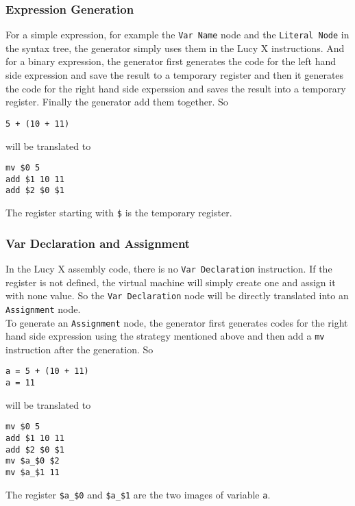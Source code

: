 \subsubsection{Expression Generation}
For a simple expression, for example the \texttt{Var Name} node and the \texttt{Literal Node} in the syntax tree, the generator simply uses them in the Lucy X instructions. And for a binary expression, the generator first generates the code for the left hand side expression and save the result to a temporary register and then it generates the code for the right hand side experssion and saves the result into a temporary register. Finally the generator add them together. So
\begin{lstlisting}
5 + (10 + 11)
\end{lstlisting}
will be translated to
\begin{lstlisting}[language=LucyX]
mv $0 5
add $1 10 11
add $2 $0 $1
\end{lstlisting}
The register starting with \texttt{\$} is the temporary register.
\subsubsection{Var Declaration and Assignment}
In the Lucy X assembly code, there is no \texttt{Var Declaration} instruction. If the register is not defined, the virtual machine will simply create one and assign it with none value. So the \texttt{Var Declaration} node will be directly translated into an \texttt{Assignment} node. \\
To generate an \texttt{Assignment} node, the generator first generates codes for the right hand side expression using the strategy mentioned above and then add a \texttt{mv} instruction after the generation. So
\begin{lstlisting}
a = 5 + (10 + 11)
a = 11
\end{lstlisting}
will be translated to
\begin{lstlisting}[language=LucyX]
mv $0 5
add $1 10 11
add $2 $0 $1
mv $a_$0 $2
mv $a_$1 11
\end{lstlisting}
The register \texttt{\$a\_\$0} and \texttt{\$a\_\$1} are the two images of variable \texttt{a}.
